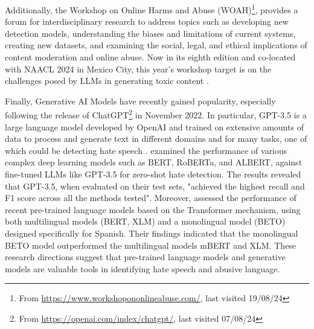 Additionally, the Workshop on Online Harms and Abuse (WOAH)\footnote{From \url{https://www.workshopononlineabuse.com/}, last visited 19/08/24}, provides a forum for interdisciplinary research to address topics such as developing new detection models, understanding the biases and limitations of current systems, creating new datasets, and examining the social, legal, and ethical implications of content moderation and online abuse. Now in its eighth edition and co-located with NAACL 2024 in Mexico City, this year's workshop target is on the challenges posed by LLMs in generating toxic content \cite{woah-2024}.

Finally, Generative AI Models have recently gained popularity, especially following the release of ChatGPT\footnote{From \url{https://openai.com/index/chatgpt/}, last visited 07/08/24} in November 2022. In particular, GPT-3.5 is a large language model developed by OpenAI and trained on extensive amounts of data to process and generate text in different domains and for many tasks, one of which could be detecting hate speech \cite{zhang-2023}. \cite{pendzel-2023} examined the performance of various complex deep learning models such as BERT, RoBERTa, and ALBERT, against fine-tuned LLMs like GPT-3.5 for zero-shot hate detection. The results revealed that GPT-3.5, when evaluated on their test sets, "achieved the highest recall and F1 score across all the methods tested". Moreover, \cite{plazaDelArco-2021} assessed the performance of recent pre-trained language models based on the Transformer mechanism, using both multilingual models (BERT, XLM) and a monolingual model (BETO) designed specifically for Spanish. Their findings indicated that the monolingual BETO model outperformed the multilingual models mBERT and XLM. These research directions suggest that pre-trained language models and generative models are valuable tools in identifying hate speech and abusive language. 


